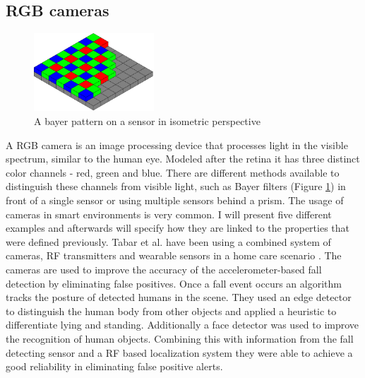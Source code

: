 \subsection{RGB cameras}
\begin{figure}[h]
\centering
\includegraphics[width=0.4\textwidth]{images/bayer_pattern_on_sensor}
\caption{A bayer pattern on a sensor in isometric perspective \cite{img_bayer_pattern}}
\label{fig:bayer_pattern}
\end{figure}
A RGB camera is an image processing device that processes light in the visible spectrum, similar to the human eye. Modeled after the retina it has three distinct color channels - red, green and blue. There are different methods available to distinguish these channels from visible light, such as Bayer filters (Figure \ref{fig:bayer_pattern}) in front of a single sensor or using multiple sensors behind a prism.
The usage of cameras in smart environments is very common. I will present five different examples and afterwards will specify how they are linked to the properties that were defined previously.
Tabar et al. have been using a combined system of cameras, RF transmitters and wearable sensors in a home care scenario \cite{tabar2006smart}. The cameras are used to improve the accuracy of the accelerometer-based fall detection by eliminating false positives. Once a fall event occurs an algorithm tracks the posture of detected humans in the scene. They used an edge detector to distinguish the human body from other objects and applied a heuristic to differentiate lying and standing.  Additionally a face detector was used to improve the recognition of human objects. Combining this with information from the fall detecting sensor and a RF based localization system they were able to achieve a good reliability in eliminating false positive alerts.
